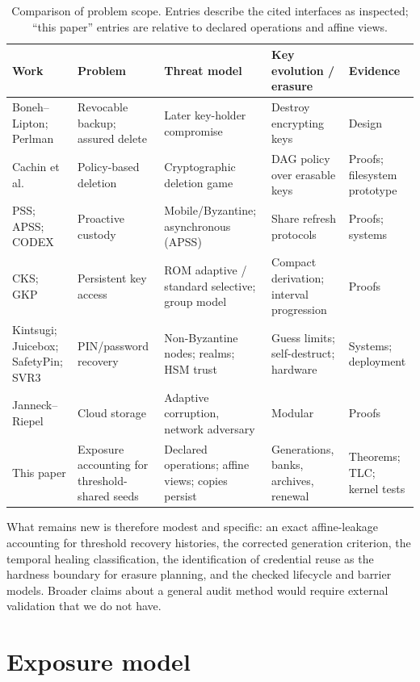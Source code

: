 \documentclass[pdflatex,sn-mathphys-num]{sn-jnl}
\theoremstyle{plain}
\theoremstyle{definition}
\begin{document}
\begin{table}[htbp]
\caption{Comparison of problem scope. Entries describe the cited interfaces as inspected; ``this paper'' entries are relative to declared operations and affine views.}\label{tab:comparison}
\centering\footnotesize
\begin{tabularx}{\linewidth}{@{}p{.15\linewidth}YYYY@{}}\toprule
Work & Problem & Threat model & Key evolution / erasure & Evidence\\\midrule
Boneh--Lipton; Perlman & Revocable backup; assured delete & Later key-holder compromise & Destroy encrypting keys & Design\\
Cachin et al. & Policy-based deletion & Cryptographic deletion game & DAG policy over erasable keys & Proofs; filesystem prototype\\
PSS; APSS; CODEX & Proactive custody & Mobile/Byzantine; asynchronous (APSS) & Share refresh protocols & Proofs; systems\\
CKS; GKP & Persistent key access & ROM adaptive / standard selective; group model & Compact derivation; interval progression & Proofs\\
Kintsugi; Juicebox; SafetyPin; SVR3 & PIN/password recovery & Non-Byzantine nodes; realms; HSM trust & Guess limits; self-destruct; hardware & Systems; deployment\\
Janneck--Riepel & Cloud storage & Adaptive corruption, network adversary & Modular & Proofs\\
This paper & Exposure accounting for threshold-shared seeds & Declared operations; affine views; copies persist & Generations, banks, archives, renewal & Theorems; TLC; kernel tests\\\bottomrule
\end{tabularx}
\end{table}

What remains new is therefore modest and specific: an exact affine-leakage accounting for threshold recovery histories, the corrected generation criterion, the temporal healing classification, the identification of credential reuse as the hardness boundary for erasure planning, and the checked lifecycle and barrier models. Broader claims about a general audit method would require external validation that we do not have.


\section{Exposure model}\label{sec:model}
\end{document}
